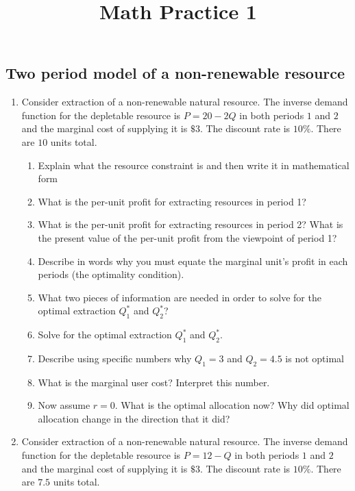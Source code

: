 \documentclass[11pt]{article}
\title{Math Practice 1}
\begin{document}
\subsection*{Two period model of a non-renewable resource}

\begin{enumerate}
  \item Consider extraction of a non-renewable natural resource. The inverse demand function for the depletable resource is $P = 20 - 2Q$ in both periods $1$ and $2$ and the marginal cost of supplying it is $\$3$. The discount rate is $10\%$. There are $10$ units total.

  \begin{enumerate}
    \item Explain what the resource constraint is and then write it in mathematical form

    \item What is the per-unit profit for extracting resources in period 1? 
    
    \item What is the per-unit profit for extracting resources in period 2? What is the present value of the per-unit profit from the viewpoint of period 1?

    \item Describe in words why you must equate the marginal unit's profit in each periods (the optimality condition). 
    
    \item What two pieces of information are needed in order to solve for the optimal extraction $Q_1^*$ and $Q_2^*$?
    
    \item Solve for the optimal extraction $Q_1^*$ and $Q_2^*$.
    
    \item Describe using specific numbers why $Q_1 = 3$ and $Q_2 = 4.5$ is not optimal

    \item What is the marginal user cost? Interpret this number.

    \item Now assume $r = 0$. What is the optimal allocation now? Why did optimal allocation change in the direction that it did?
  \end{enumerate}

  \item Consider extraction of a non-renewable natural resource. The inverse demand function for the depletable resource is $P = 12 - Q$ in both periods $1$ and $2$ and the marginal cost of supplying it is $\$3$. The discount rate is $10\%$. There are $7.5$ units total.


\end{enumerate}
\end{document}

